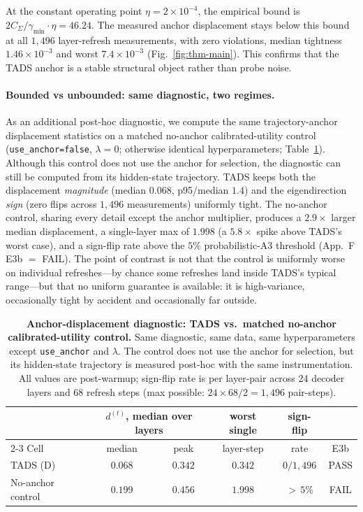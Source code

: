 At the constant operating point $\eta=2\times 10^{-4}$, the
empirical bound is $2\hat{C}_\Sigma/\gamma_{\min}\cdot \eta=46.24$.
The measured anchor displacement stays below this bound at all
$1{,}496$ layer-refresh measurements, with zero violations, median
tightness $1.46\times 10^{-3}$ and worst $7.4\times 10^{-3}$
(Fig.~\ref{fig:thm-main}). This confirms that the \textsc{TADS}
anchor is a stable structural object rather than probe noise.

\paragraph{Bounded vs unbounded: same diagnostic, two regimes.}
As an additional post-hoc diagnostic, we compute the same
trajectory-anchor displacement statistics on a matched no-anchor
calibrated-utility control (\texttt{use\_anchor=false}, $\lambda=0$;
otherwise identical hyperparameters; Table~\ref{tab:dstep-spread}).
Although this control does not use the anchor for selection, the
diagnostic can still be computed from its hidden-state trajectory.
\textsc{TADS} keeps both the displacement \emph{magnitude} (median
$0.068$, p95/median $1.4$) and the eigendirection \emph{sign} (zero
flips across $1{,}496$ measurements) uniformly tight. The no-anchor
control, sharing every detail except the anchor multiplier, produces
a $2.9\times$ larger median displacement, a single-layer max of
$1.998$ (a $5.8\times$ spike above \textsc{TADS}'s worst case), and
a sign-flip rate above the $5\%$ probabilistic-A3 threshold
(App.~F E3b $=$ FAIL). The point of contrast is not that the control
is uniformly worse on individual refreshes---by chance some
refreshes land inside \textsc{TADS}'s typical range---but that no
uniform guarantee is available: it is high-variance, occasionally
tight by accident and occasionally far outside.
\begin{table}[t]
\centering
\caption{\textbf{Anchor-displacement diagnostic: \textsc{TADS} vs.\
matched no-anchor calibrated-utility control.} Same diagnostic, same
data, same hyperparameters except \texttt{use\_anchor} and $\lambda$.
The control does not use the anchor for selection, but its
hidden-state trajectory is measured post-hoc with the same
instrumentation. All values are post-warmup; sign-flip rate is per
layer-pair across 24 decoder layers and 68 refresh steps (max
possible: $24 \times 68 / 2 = 1{,}496$ pair-steps).}
\label{tab:dstep-spread}
\small
\setlength{\tabcolsep}{5pt}
\begin{tabular}{@{}lccccc@{}}
\toprule
 & \multicolumn{2}{c}{$d^{(t)}$, median over layers} & worst single & sign-flip & \\
\cmidrule(lr){2-3}
Cell & median & peak & layer-step & rate & E3b \\
\midrule
\textsc{TADS} (D)        & $0.068$ & $0.342$ & $0.342$ & $0 / 1{,}496$ & PASS \\
No-anchor control        & $0.199$ & $0.456$ & $1.998$ & ${>}\,5\%$    & FAIL \\
\bottomrule
\end{tabular}
\end{table}

